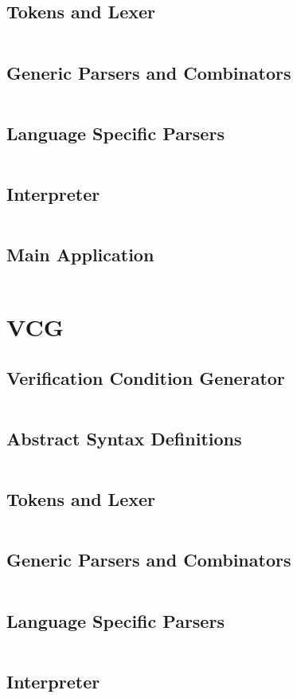 \documentclass[a4paper,9pt,twoside]{book}
\newcommand{\hsfile}[1]{\inputminted[breaklines]{haskell}{../haskell/#1.hs}}
\begin{document}
\section{Tokens and Lexer}
\hsfile{interpreter/Scanner}
\section{Generic Parsers and Combinators}
\hsfile{interpreter/ParserCombis2}
\section{Language Specific Parsers}
\hsfile{interpreter/Parser2}
\section{Interpreter}
\hsfile{interpreter/Interpreter}
\section{Main Application}
\hsfile{interpreter/Main}

\chapter{VCG}
\section{Verification Condition Generator}
\hsfile{vcg/VCG}
\section{Abstract Syntax Definitions}
\hsfile{vcg/AbsSyn}
\section{Tokens and Lexer}
\hsfile{vcg/Scanner}
\section{Generic Parsers and Combinators}
\hsfile{vcg/ParserCombis}
\section{Language Specific Parsers}
\hsfile{vcg/Parser}
\section{Interpreter}
\hsfile{vcg/Interpreter}
\end{document}
